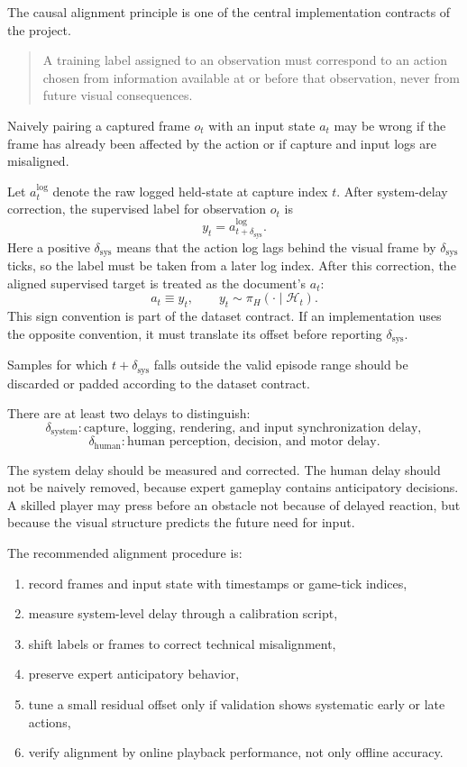 \documentclass[11pt]{article}
\begin{document}
The causal alignment principle is one of the central implementation contracts of the project.
\begin{quote}
A training label assigned to an observation must correspond to an action chosen from information available at or before that observation, never from future visual consequences.
\end{quote}

Naively pairing a captured frame \(o_t\) with an input state \(a_t\) may be wrong if the frame has already been affected by the action or if capture and input logs are misaligned.

Let \(a_t^{\mathrm{log}}\) denote the raw logged held-state at capture index \(t\). After system-delay correction, the supervised label for observation \(o_t\) is
\[
  y_t = a^{\mathrm{log}}_{t+\delta_{\mathrm{sys}}}.
\]
Here a positive \(\delta_{\mathrm{sys}}\) means that the action log lags behind the visual frame by \(\delta_{\mathrm{sys}}\) ticks, so the label must be taken from a later log index. After this correction, the aligned supervised target is treated as the document's \(a_t\):
\[
  a_t \equiv y_t,
  \qquad
  y_t \sim \pi_H(\cdot \mid \mathcal{H}_t).
\]
This sign convention is part of the dataset contract. If an implementation uses the opposite convention, it must translate its offset before reporting \(\delta_{\mathrm{sys}}\).

Samples for which \(t+\delta_{\mathrm{sys}}\) falls outside the valid episode range should be discarded or padded according to the dataset contract.

There are at least two delays to distinguish:
\[
  \delta_{\mathrm{system}}:
  \text{capture, logging, rendering, and input synchronization delay},
\]
\[
  \delta_{\mathrm{human}}:
  \text{human perception, decision, and motor delay}.
\]

The system delay should be measured and corrected. The human delay should not be naively removed, because expert gameplay contains anticipatory decisions. A skilled player may press before an obstacle not because of delayed reaction, but because the visual structure predicts the future need for input.

The recommended alignment procedure is:
\begin{enumerate}
  \item record frames and input state with timestamps or game-tick indices,
  \item measure system-level delay through a calibration script,
  \item shift labels or frames to correct technical misalignment,
  \item preserve expert anticipatory behavior,
  \item tune a small residual offset only if validation shows systematic early or late actions,
  \item verify alignment by online playback performance, not only offline accuracy.
\end{enumerate}
\end{document}
